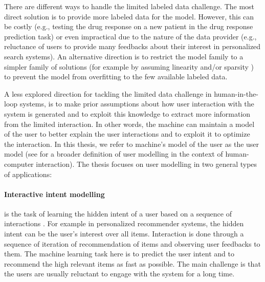 \documentclass[dissertation,math,vertlayout,pdfa,colorlinks]{aaltoseries}
\begin{document}

There are different ways to handle the limited labeled data challenge. The most direct solution is to provide more labeled data for the model. However, this can be costly (e.g., testing the drug response on a new patient in the drug response prediction task) or even impractical due to the nature of the data provider (e.g., reluctance of users to provide many feedbacks about their interest in personalized search systems). An alternative direction is to restrict the model family to a simpler family of solutions (for example by assuming linearity and/or sparsity \cite{lasso2011}) to prevent the model from overfitting to the few available labeled data. 

A less explored direction for tackling the limited data challenge in human-in-the-loop systems, is to make prior assumptions about how user interaction with the system is generated and to exploit this knowledge to extract more information from the limited interaction. In other words, the machine can maintain a model of the user to better explain the user interactions and to exploit it to optimize the interaction. In this thesis, we refer to machine's model of the user as the user model (see \cite{user_modelling_2001} for a broader definition of user modelling in the context of human-computer interaction). The thesis focuses on user modelling in two general types of applications:

\paragraph{Interactive intent modelling} is the task of learning the hidden intent of a user based on a sequence of interactions \cite{ruotsalo2015interactive}. For example in personalized recommender systems, the hidden intent can be the user's interest over all items. Interaction is done through a sequence of iteration of recommendation of items and observing user feedbacks to them. The machine learning task here is to predict the user intent and to recommend the high relevant items as fast as possible. The main challenge is that the users are usually reluctant to engage with the system for a long time. %
\end{document}
